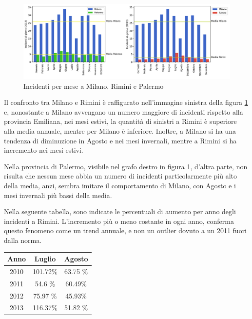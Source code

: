 \documentclass[a4paper,12pt]{report}
\begin{document}
\begin{figure}
    \includegraphics[width=\linewidth]{img_unite/milano_rimini_palermo.png}
    \caption{Incidenti per mese a Milano, Rimini e Palermo}
    \label{fig:milano-rimini}
\end{figure}

Il confronto tra Milano e Rimini è raffigurato nell'immagine sinistra della 
figura \ref{fig:milano-rimini} e, nonostante a Milano avvengano un numero maggiore di 
incidenti rispetto alla provincia Emiliana, nei mesi estivi, 
la quantità di sinistri a Rimini è superiore alla media annuale, 
mentre per Milano è inferiore. 
Inoltre, a Milano si ha una tendenza di diminuzione in Agosto e nei 
mesi invernali, mentre a Rimini si ha incremento nei mesi estivi.

Nella provincia di Palermo, visibile nel grafo destro in figura \ref{fig:milano-rimini}, 
d'altra parte, non risulta che nessun mese abbia un numero di incidenti 
particolarmente più alto della media, anzi, sembra imitare il comportamento di 
Milano, con Agosto e i mesi invernali più bassi della media.

Nella seguente tabella, sono indicate le percentuali di aumento per anno degli 
incidenti a Rimini.
L'incremento più o meno costante in ogni anno, conferma questo fenomeno come un trend 
annuale, e non un outlier dovuto a un 2011 fuori dalla norma.

\begin{center}
    \def\arraystretch{1.5}%
    \begin{tabular}{ |c|c|c| } 
    \hline
    Anno & Luglio   & Agosto \\ 
    \hline
    \rowcolor{TableGray}
    2010 & 101.72\% & 63.75 \% \\ 
    2011 & 54.6  \%  & 60.49\% \\
    \rowcolor{TableGray}
    2012 & 75.97 \%  & 45.93\%\\
    2013 & 116.37\% & 51.82 \%\\
    \hline
    \end{tabular}
\end{center}
\end{document}
